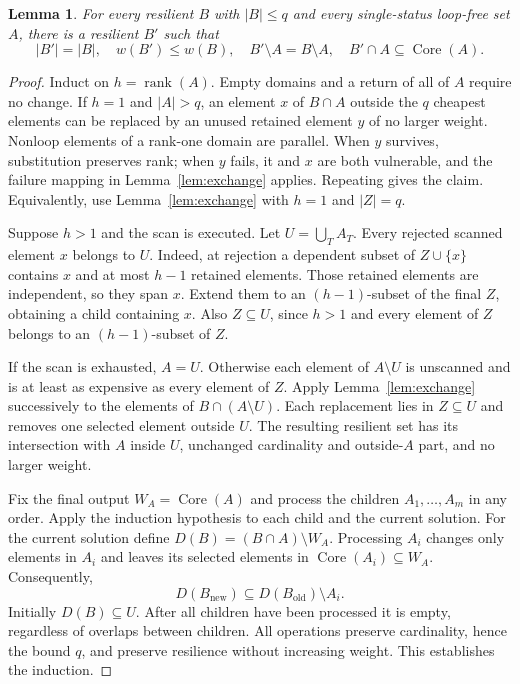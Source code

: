 \documentclass[11pt]{article}
\newtheorem{lemma}[theorem]{Lemma}
\theoremstyle{definition}\newtheorem{definition}[theorem]{Definition}
\theoremstyle{remark}\newtheorem{remark}[theorem]{Remark}
\DeclareMathOperator{\rk}{rank}
\DeclareMathOperator{\Core}{Core}
\begin{document}
\begin{lemma}\label{lem:core}
For every resilient $B$ with $|B|\leq q$ and every single-status loop-free set $A$, there is a resilient $B'$ such that
\[
 |B'|=|B|,\quad w(B')\leq w(B),\quad B'\setminus A=B\setminus A,
 \quad B'\cap A\subseteq\Core(A).
\]
\end{lemma}
\begin{proof}
Induct on $h=\rk(A)$. Empty domains and a return of all of $A$ require no change. If $h=1$ and $|A|>q$, an element $x$ of $B\cap A$ outside the $q$ cheapest elements can be replaced by an unused retained element $y$ of no larger weight. Nonloop elements of a rank-one domain are parallel. When $y$ survives, substitution preserves rank; when $y$ fails, it and $x$ are both vulnerable, and the failure mapping in Lemma~\ref{lem:exchange} applies. Repeating gives the claim. Equivalently, use Lemma~\ref{lem:exchange} with $h=1$ and $|Z|=q$.

Suppose $h>1$ and the scan is executed. Let $U=\bigcup_T A_T$. Every rejected scanned element $x$ belongs to $U$. Indeed, at rejection a dependent subset of $Z\cup\{x\}$ contains $x$ and at most $h-1$ retained elements. Those retained elements are independent, so they span $x$. Extend them to an $(h-1)$-subset of the final $Z$, obtaining a child containing $x$. Also $Z\subseteq U$, since $h>1$ and every element of $Z$ belongs to an $(h-1)$-subset of $Z$.

If the scan is exhausted, $A=U$. Otherwise each element of $A\setminus U$ is unscanned and is at least as expensive as every element of $Z$. Apply Lemma~\ref{lem:exchange} successively to the elements of $B\cap(A\setminus U)$. Each replacement lies in $Z\subseteq U$ and removes one selected element outside $U$. The resulting resilient set has its intersection with $A$ inside $U$, unchanged cardinality and outside-$A$ part, and no larger weight.

Fix the final output $W_A=\Core(A)$ and process the children $A_1,\ldots,A_m$ in any order. Apply the induction hypothesis to each child and the current solution. For the current solution define $D(B)=(B\cap A)\setminus W_A$. Processing $A_i$ changes only elements in $A_i$ and leaves its selected elements in $\Core(A_i)\subseteq W_A$. Consequently,
\[
 D(B_{\mathrm{new}})\subseteq D(B_{\mathrm{old}})\setminus A_i.
\]
Initially $D(B)\subseteq U$. After all children have been processed it is empty, regardless of overlaps between children. All operations preserve cardinality, hence the bound $q$, and preserve resilience without increasing weight. This establishes the induction.
\end{proof}
\end{document}
